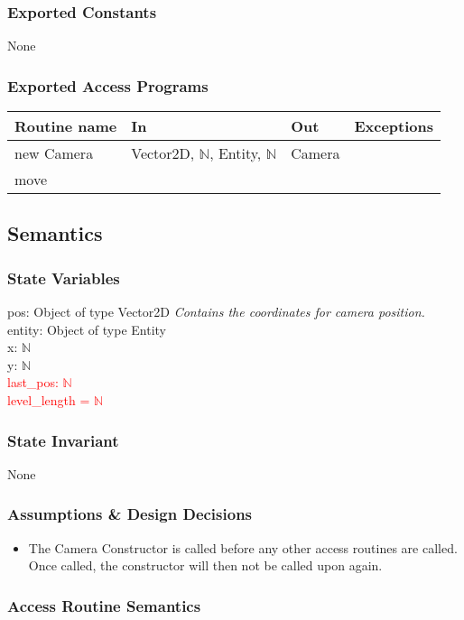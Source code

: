 \documentclass[12pt]{article}
\begin{document}
\subsubsection*{Exported Constants}
None
\subsubsection*{Exported Access Programs}
\begin{tabular}{| l | l | l | p{5cm} |}
\hline
\textbf{Routine name} & \textbf{In} & \textbf{Out} & \textbf{Exceptions}\\
\hline
new Camera & Vector2D, $\mathbb{N}$, Entity, $\mathbb{N}$ & Camera & \\
\hline
move & & &\\
\hline
\end{tabular}

\subsection*{Semantics}
\subsubsection*{State Variables}
pos: Object of type Vector2D \emph{Contains the coordinates for camera position.}\\ 
entity: Object of type Entity\\
x: $\mathbb{N}$\\ 
y: $\mathbb{N}$\\
\textcolor{red}{last\_pos: $\mathbb{N}$}\\
\textcolor{red}{level\_length = $\mathbb{N}$}\\

\subsubsection*{State Invariant}
None
\subsubsection*{Assumptions \& Design Decisions}
\begin{itemize}
    \item The Camera Constructor is called before any other access routines are called. Once called, the constructor will then not be called upon again.
\end{itemize}

\subsubsection*{Access Routine Semantics}
\end{document}
